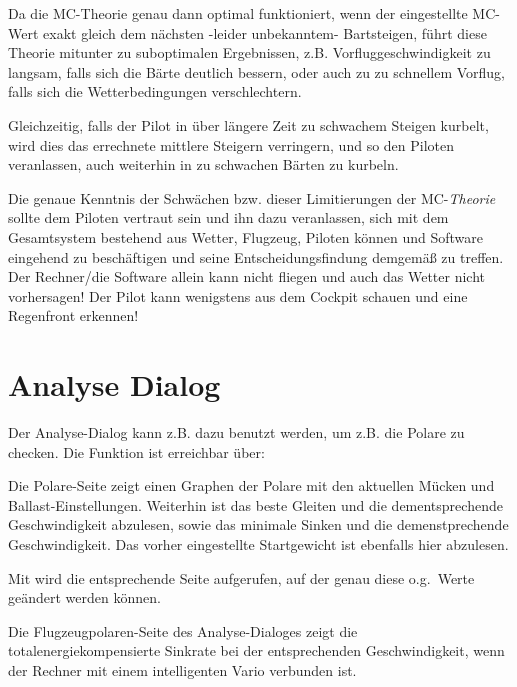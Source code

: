 Da die MC-Theorie genau dann optimal funktioniert, wenn der eingestellte MC-Wert exakt gleich dem
nächsten -leider unbekanntem- Bartsteigen, führt diese Theorie mitunter zu suboptimalen Ergebnissen,
z.B. Vorfluggeschwindigkeit zu langsam, falls sich die Bärte deutlich bessern, oder auch zu zu schnellem Vorflug,
falls sich die Wetterbedingungen verschlechtern.

Gleichzeitig,  falls der Pilot in über längere Zeit zu schwachem Steigen kurbelt,
wird dies das errechnete mittlere Steigern verringern, und so den Piloten veranlassen, auch
weiterhin in zu schwachen Bärten zu kurbeln.


\textsf{\textcolor[rgb]{0.00,0.00,0.50}
{Die genaue Kenntnis der Schwächen bzw. dieser Limitierungen
der MC-\textsl{Theorie} sollte  dem Piloten vertraut sein und ihn dazu veranlassen, sich mit dem
Gesamtsystem bestehend aus Wetter, Flugzeug, Piloten können und Software eingehend zu beschäftigen
und seine Entscheidungsfindung demgemäß zu treffen. Der Rechner/die Software allein kann nicht fliegen
und auch das Wetter nicht vorhersagen! Der Pilot kann wenigstens aus dem Cockpit schauen und eine
Regenfront erkennen!}}

\section{Analyse Dialog}

Der Analyse-Dialog kann z.B. dazu benutzt werden, um z.B. die Polare zu checken.
Die Funktion ist erreichbar über:


Die Polare-Seite zeigt einen  Graphen der Polare mit den aktuellen Mücken und Ballast-Einstellungen.
Weiterhin ist das beste Gleiten und die dementsprechende Geschwindigkeit abzulesen, sowie das
minimale Sinken und die demenstprechende Geschwindigkeit.
Das vorher eingestellte  Startgewicht ist ebenfalls hier  abzulesen.

Mit  wird die entsprechende Seite aufgerufen, auf der genau diese o.g.\ Werte geändert werden können.

Die Flugzeugpolaren-Seite  des Analyse-Dialoges zeigt die totalenergiekompensierte Sinkrate bei der
entsprechenden Geschwindigkeit, wenn der Rechner mit einem intelligenten Vario verbunden ist.

